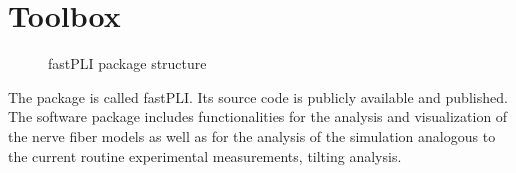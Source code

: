 \section{Toolbox}
% 
\begin{figure}[!ht]
\centering
\caption[\acs{fastPLI}]{\ac{fastPLI} package structure}
\label{fig:fastpli}
\end{figure}
% 
The \python{} package is called \ac{fastPLI}.
Its source code is publicly available and \cite{fastpli,Matuschke2021} published.
The software package includes functionalities for the analysis and visualization of the nerve fiber models as well as for the analysis of the simulation analogous to the current routine experimental measurements, \eg{} tilting analysis.
% 
% 
% 
